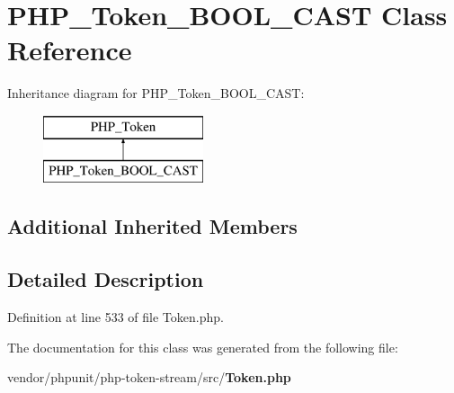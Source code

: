 \section{P\+H\+P\+\_\+\+Token\+\_\+\+B\+O\+O\+L\+\_\+\+C\+A\+S\+T Class Reference}
\label{class_p_h_p___token___b_o_o_l___c_a_s_t}
Inheritance diagram for P\+H\+P\+\_\+\+Token\+\_\+\+B\+O\+O\+L\+\_\+\+C\+A\+S\+T\+:\begin{figure}[H]
\begin{center}
\leavevmode
\includegraphics[height=2.000000cm]{class_p_h_p___token___b_o_o_l___c_a_s_t}
\end{center}
\end{figure}
\subsection*{Additional Inherited Members}


\subsection{Detailed Description}


Definition at line 533 of file Token.\+php.



The documentation for this class was generated from the following file\+:\begin{DoxyCompactItemize}
\item 
vendor/phpunit/php-\/token-\/stream/src/{\bf Token.\+php}\end{DoxyCompactItemize}
